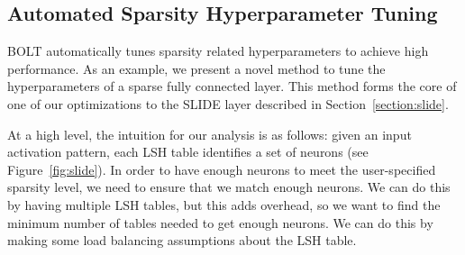\documentclass[sigconf]{acmart}
\begin{document}
\subsection{Automated Sparsity Hyperparameter Tuning}

BOLT automatically tunes sparsity related hyperparameters to achieve high performance. As an example, we present a novel method to tune the hyperparameters of a sparse fully connected layer. This method forms the core of one of our optimizations to the SLIDE layer described in Section~\ref{section:slide}. 

At a high level, the intuition for our analysis is as follows: given an input activation pattern, each LSH table identifies a set of neurons (see Figure~\ref{fig:slide}). In order to have enough neurons to meet the user-specified sparsity level, we need to ensure that we match enough neurons. We can do this by having multiple LSH tables, but this adds overhead, so we want to find the minimum number of tables needed to get enough neurons. We can do this by making some load balancing assumptions about the LSH table. 
\end{document}
